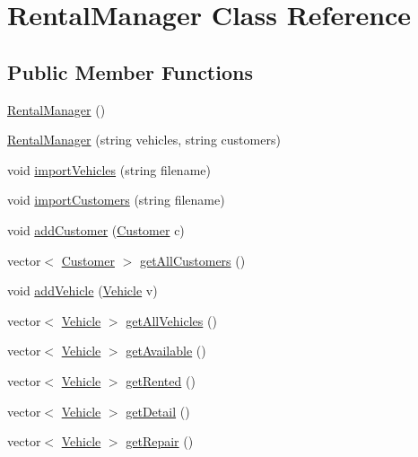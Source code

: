 \hypertarget{class_rental_manager}{}\section{Rental\+Manager Class Reference}
\label{class_rental_manager}
\subsection*{Public Member Functions}
\begin{DoxyCompactItemize}
\item 
\hyperlink{class_rental_manager_a2e8eabdde863514dd4ca13a5e3a4e533}{Rental\+Manager} ()
\item 
\hyperlink{class_rental_manager_a0c8562369e957400e17bd176ee18c91f}{Rental\+Manager} (string vehicles, string customers)
\item 
void \hyperlink{class_rental_manager_a4c4b5e823b02baccd591f91448d7b1d7}{import\+Vehicles} (string filename)
\item 
void \hyperlink{class_rental_manager_a1a1f994736ce9ccb3d3ceef5cfdd255e}{import\+Customers} (string filename)
\item 
void \hyperlink{class_rental_manager_a7f78be10cb46d3737775d6610c517d71}{add\+Customer} (\hyperlink{class_customer}{Customer} c)
\item 
vector$<$ \hyperlink{class_customer}{Customer} $>$ \hyperlink{class_rental_manager_a86ea87b26b3617dffff621c88066d4f1}{get\+All\+Customers} ()
\item 
void \hyperlink{class_rental_manager_a4363860fad4cfdd5ab189667e2dfc3d4}{add\+Vehicle} (\hyperlink{class_vehicle}{Vehicle} v)
\item 
vector$<$ \hyperlink{class_vehicle}{Vehicle} $>$ \hyperlink{class_rental_manager_a4b719aa2506aafc07656fc1c45c94aca}{get\+All\+Vehicles} ()
\item 
vector$<$ \hyperlink{class_vehicle}{Vehicle} $>$ \hyperlink{class_rental_manager_adf8270be0e9980c4cee3deb484392e15}{get\+Available} ()
\item 
vector$<$ \hyperlink{class_vehicle}{Vehicle} $>$ \hyperlink{class_rental_manager_af1d5c4eb5b893fbec7c87610a11b6da4}{get\+Rented} ()
\item 
vector$<$ \hyperlink{class_vehicle}{Vehicle} $>$ \hyperlink{class_rental_manager_a9fb595d425dc7d770b1a506be4895fd2}{get\+Detail} ()
\item 
vector$<$ \hyperlink{class_vehicle}{Vehicle} $>$ \hyperlink{class_rental_manager_a7aeec650157e516c093df63fdb49c971}{get\+Repair} ()

\end{DoxyCompactItemize}
